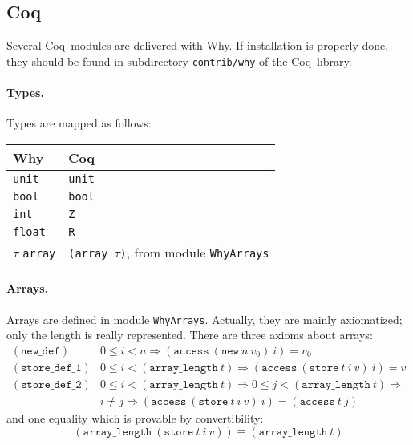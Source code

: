 \documentclass[a4paper,12pt]{report}
\makeatletter
\newcommand{\coq}{\textsf{Coq}\index{Coq@\textsf{Coq}}}
\newcommand{\why}{\textsf{Why}}
\newcommand{\te}[1]{\texttt{#1}}
\makeatother
\begin{document}
\subsection{Coq}
\label{lib:coq}

Several \coq\ modules are delivered with \why. If installation is
properly done, they should be found in subdirectory
\texttt{contrib/why} of the \coq\ library.

\paragraph{Types.} 
Types are mapped as follows:
\begin{center}
  \begin{tabular}{|l|l|}
    \hline
    \why & \coq \\
    \hline
    \texttt{unit} & \texttt{unit} \\
    \hline
    \texttt{bool} & \texttt{bool} \\
    \hline
    \texttt{int} & \texttt{Z} \\
    \hline
    \texttt{float} & \texttt{R} \\
    \hline
    $\tau$ \texttt{array} & \texttt{(array $\tau$)},
                            from module \texttt{WhyArrays} \\
    \hline
  \end{tabular}
\end{center}

\paragraph{Arrays.} 
Arrays are defined in module \texttt{WhyArrays}. Actually, they are
mainly axiomatized; only the length is really represented.
There are three axioms about arrays:
\begin{displaymath}
  \begin{array}{rl}
    (\te{new\_def}) &
    0 \le i < n \Rightarrow (\te{access} ~ (\te{new} ~ n ~ v_0) ~ i) = v_0 
    \\[1em]
    (\te{store\_def\_1}) &
    0 \le i < (\te{array\_length} ~ t) \Rightarrow
                    (\te{access} ~ (\te{store} ~ t ~ i ~ v) ~ i) = v
    \\[1em]
    (\te{store\_def\_2}) &
    0 \le i < (\te{array\_length} ~ t) \Rightarrow
    0 \le j < (\te{array\_length} ~ t) \Rightarrow \\ &
                    i \not= j \Rightarrow
                    (\te{access} ~ (\te{store} ~ t ~ i ~ v) ~ i) =
                    (\te{access} ~ t ~ j)
  \end{array}
\end{displaymath}
and one equality which is provable by convertibility:
\begin{displaymath}
  (\te{array\_length} ~ (\te{store} ~ t ~ i ~ v)) \equiv
  (\te{array\_length} ~ t)
\end{displaymath}
\end{document}
